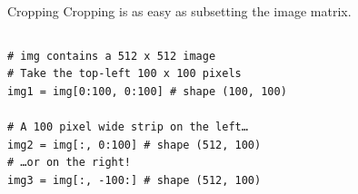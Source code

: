\documentclass[9pt, aspectratio=169]{beamer}
\begin{document}
\begin {frame}
{Cropping}
Cropping is as easy as subsetting the image matrix.


\begin{columns}
    \begin{column}{0.6\textwidth}
        \begin{codebox}
            \texttt{\# img contains a 512 x 512 image\\
                \# Take the top-left 100 x 100 pixels\\
                img1 = img[0:100, 0:100] \# shape (100, 100)\\
                {\\
                    \# A 100 pixel wide strip on the left\dots\\
                    img2 = img[:, 0:100] \# shape (512, 100)\\
                    \# \dots or on the right!\\
                    img3 = img[:, -100:] \# shape (512, 100)
                }
            }
        \end{codebox}
    \end{column}
    \begin{column}{0.4\textwidth}
    \end{column}
\end{columns}
\end{frame}
\end{document}
